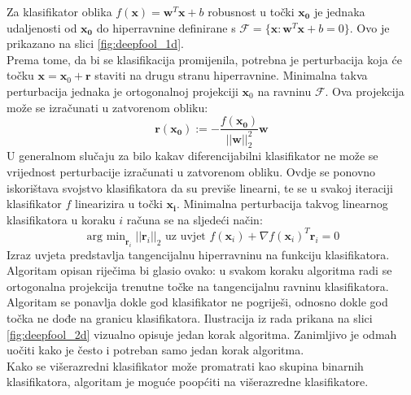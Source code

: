 \documentclass[utf8, diplomski]{fer}
\begin{document}
Za klasifikator oblika $f(\boldsymbol{x}) = \boldsymbol{w}^{T}\boldsymbol{x} + b$ robusnost u točki $\boldsymbol{x_{0}}$ je jednaka udaljenosti od $\boldsymbol{x_{0}}$ do hiperravnine definirane s $\mathscr{F} = \{\boldsymbol{x} : \boldsymbol{w}^{T}\boldsymbol{x}+b=0\}$. Ovo je prikazano na slici \ref{fig:deepfool_1d}. \\
Prema tome, da bi se klasifikacija promijenila, potrebna je perturbacija koja će točku $\boldsymbol{x} = \boldsymbol{x}_{0} + \boldsymbol{r}$ staviti na drugu stranu hiperravnine. Minimalna takva perturbacija jednaka je ortogonalnoj projekciji $\boldsymbol{x}_{0}$ na ravninu $\mathscr{F}$. Ova projekcija može se izračunati u zatvorenom obliku:
\begin{equation}
	\boldsymbol{r}(\boldsymbol{x_{0}}) := - \frac{f(\boldsymbol{x_{0}})}{||\boldsymbol{w}||_{2}^{2}}\boldsymbol{w}
\end{equation}
U generalnom slučaju za bilo kakav diferencijabilni klasifikator ne može se vrijednost perturbacije izračunati u zatvorenom obliku. Ovdje se ponovno iskorištava svojstvo klasifikatora da su previše linearni, te se u svakoj iteraciji klasifikator $f$ linearizira u točki $\boldsymbol{x_{i}}$. Minimalna perturbacija takvog linearnog klasifikatora u koraku $i$ računa se na sljedeći način:
\begin{equation}
	\mathop{\text{arg min}}_{\boldsymbol{r}_{i}}||\boldsymbol{r}_{i}||_{2} \text{ uz uvjet } f(\boldsymbol{x}_{i}) + \nabla f(\boldsymbol{x}_{i})^{T}\boldsymbol{r}_{i} = 0
\end{equation}
Izraz uvjeta predstavlja tangencijalnu hiperravninu na funkciju klasifikatora. Algoritam opisan riječima bi glasio ovako: u svakom koraku algoritma radi se ortogonalna projekcija trenutne točke na tangencijalnu ravninu klasifikatora. Algoritam se ponavlja dokle god klasifikator ne pogriješi, odnosno dokle god točka ne dođe na granicu klasifikatora. Ilustracija iz rada prikana na slici \ref{fig:deepfool_2d} vizualno opisuje jedan korak algoritma. Zanimljivo je odmah uočiti kako je često i potreban samo jedan korak algoritma. \\
Kako se višerazredni klasifikator može promatrati kao skupina binarnih klasifikatora, algoritam je moguće poopćiti na višerazredne klasifikatore. \\
\end{document}
